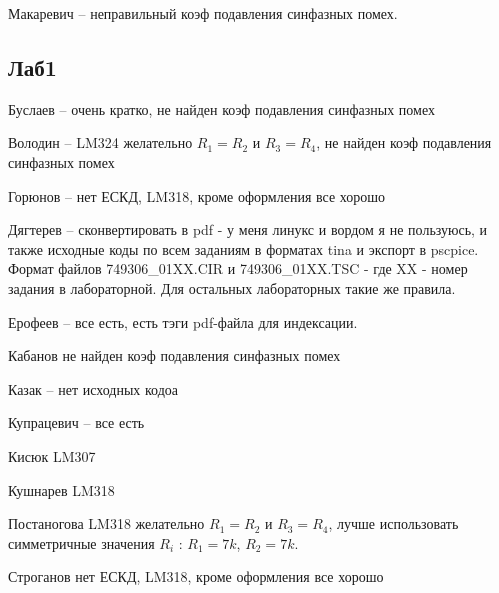 \documentclass[a4paper,11pt]{article}
\begin{document}
Макаревич -- неправильный коэф подавления синфазных помех.


\subsection*{Лаб1} 

Буслаев  -- очень кратко, не найден коэф подавления синфазных помех

Володин -- LM324  желательно $R_1=R_2$ и $R_3=R_4$, не найден коэф подавления синфазных помех

Горюнов  -- нет ЕСКД, LM318, кроме оформления все хорошо

Дягтерев -- сконвертировать в pdf - у меня линукс и вордом я не пользуюсь, и также исходные коды по всем заданиям в форматах tina и экспорт в pscpice. Формат файлов 749306\_01XX.CIR 
и 749306\_01XX.TSC - где XX - номер задания в лабораторной. Для остальных лабораторных такие же правила. 

Ерофеев -- все есть, есть тэги pdf-файла для индексации.

Кабанов  не найден коэф подавления синфазных помех

Казак -- нет исходных кодоа

Купрацевич -- все есть

Кисюк LM307

Кушнарев LM318

Постаногова LM318 желательно $R_1=R_2$ и $R_3=R_4$, лучше использовать симметричные значения $R_i$ : $R_1=7k$, $R_2=7k$. 

Строганов нет ЕСКД, LM318, кроме оформления все хорошо
\end{document}
